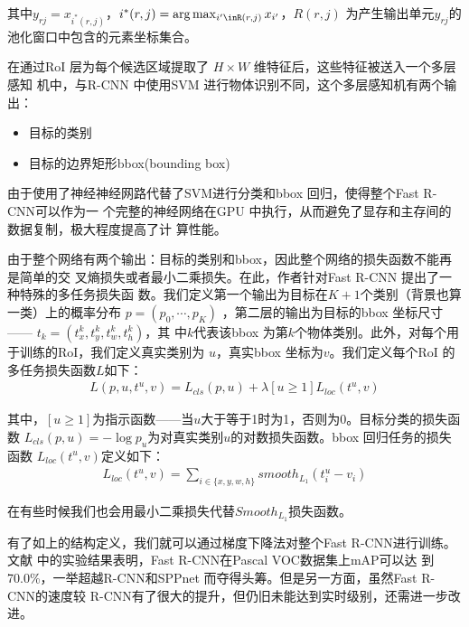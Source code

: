 其中$y_{rj} = x_{i^*(r,j)}$，$i^*(r,j) = \arg\max_{i'\inR(r,j)}x_{i'}$，$R(r,j)$
为产生输出单元$y_{rj}$的池化窗口中包含的元素坐标集合。

在通过RoI 层为每个候选区域提取了 $H \times W$ 维特征后，这些特征被送入一个多层感知
机中，与R-CNN 中使用SVM 进行物体识别不同，这个多层感知机有两个输出：

\begin{itemize}
  \item 目标的类别
  \item 目标的边界矩形bbox(bounding box)
\end{itemize}

由于使用了神经神经网路代替了SVM进行分类和bbox 回归，使得整个Fast R-CNN可以作为一
个完整的神经网络在GPU 中执行，从而避免了显存和主存间的数据复制，极大程度提高了计
算性能。

由于整个网络有两个输出：目标的类别和bbox，因此整个网络的损失函数不能再是简单的交
叉熵损失或者最小二乘损失。在此，作者针对Fast R-CNN 提出了一种特殊的多任务损失函
数。我们定义第一个输出为目标在$K+1$个类别（背景也算一类）上的概率分布 $p = (p_0,
\cdots, p_K)$ ，第二层的输出为目标的bbox 坐标尺寸 —— $t_k = (t_x^k, t_y^k, t_w^k, t_h^k)$，其
中$k$代表该bbox 为第$k$个物体类别。此外，对每个用于训练的RoI，我们定义真实类别为
$u$，真实bbox 坐标为$v$。我们定义每个RoI 的多任务损失函数$L$如下：
\begin{equation}
\begin{aligned}
L(p, u, t^u, v) = L_{cls}(p, u) + \lambda[u \geq 1]L_{loc}(t^u, v)
\end{aligned}
\end{equation}

其中，$[u \geq 1]$为指示函数——当$u$大于等于1时为1，否则为0。目标分类的损失函数
$L_{cls}(p,u) = -\log{p_u}$为对真实类别$u$的对数损失函数。bbox 回归任务的损失函数
$L_{loc}(t^u,v)$定义如下：
\begin{equation}
\begin{aligned}
L_{loc}(t^u, v) = \sum_{i\in \{x,y,w,h\}}{smooth_{L_1}(t_i^u-v_i)}
\end{aligned}
\end{equation}

在有些时候我们也会用最小二乘损失代替$Smooth_{L_1}$损失函数。

有了如上的结构定义，我们就可以通过梯度下降法对整个Fast R-CNN进行训练。文献
\cite{Girshick:2015ib}中的实验结果表明，Fast R-CNN在Pascal VOC数据集上mAP可以达
到70.0\%，一举超越R-CNN和SPPnet 而夺得头筹。但是另一方面，虽然Fast R-CNN的速度较
R-CNN有了很大的提升，但仍旧未能达到实时级别，还需进一步改进。


